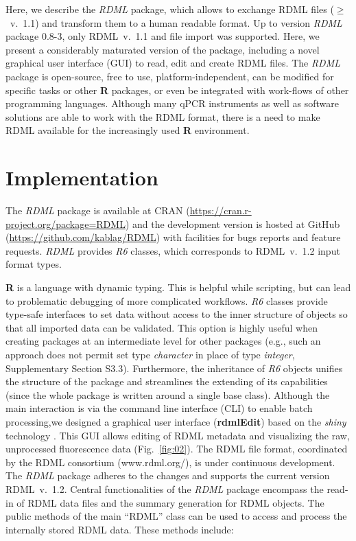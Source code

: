 \documentclass{bioinfo}
\begin{document}
Here, we describe the \textit{RDML} package, which 
allows to exchange RDML files ($\geq$~v.~1.1) and transform them to a human 
readable format. Up to version \textit{RDML} package 0.8-3, only RDML~v.~1.1 and 
file import was supported. Here, we present a considerably maturated version of 
the package, including a novel graphical user interface (GUI) to read, edit and create RDML files. The \textit{RDML} package is open-source, free to use, 
platform-independent, can be modified for specific tasks or other 
\textbf{R} packages, or even be integrated with work-flows of other programming 
languages. Although many qPCR instruments as well as software solutions are able 
to work with the RDML format, there is a need to make RDML available for the increasingly 
used \textbf{R} environment.

\section{Implementation}
The \textit{RDML} package is available at CRAN 
(\url{https://cran.r-project.org/package=RDML}) and the 
development version is hosted at GitHub (\url{https://github.com/kablag/RDML}) 
with facilities for bugs reports and feature requests. \textit{RDML} provides 
\emph{R6} classes, which corresponds to RDML~v.~1.2 input format types. 

\textbf{R} 
is a language with dynamic typing. This is helpful while scripting, but can lead 
to problematic debugging of more complicated workflows. \emph{R6} classes 
provide type-safe interfaces to set data without access to the inner structure of 
objects so that all imported data can be validated. This option is highly useful when 
creating packages at an intermediate level for other packages (e.g., such an
approach does not permit set type \emph{character} in place of type \emph{integer}, 
Supplementary Section S3.3). Furthermore, the inheritance of \emph{R6} objects 
unifies the structure of the package and streamlines the extending of its capabilities 
(since the whole package is written around a single base class). Although the main interaction 
is via the command line interface (CLI) to enable batch processing,we designed a graphical user
interface (\textbf{rdmlEdit}) based on the \textit{shiny} technology \cite{shiny_2016}. This GUI allows editing of RDML metadata and visualizing the raw, unprocessed fluorescence data
(Fig.~\ref{fig:02}). The RDML file format, coordinated by the RDML consortium (www.rdml.org/), is under continuous development. The \textit{RDML} 
package adheres to the changes and supports the current version RDML~v.~1.2. 
Central functionalities of the \textit{RDML} package encompass the read-in of RDML 
data files and the summary generation for RDML objects. The public methods of the main “RDML” class can be used 
to access and process the internally stored RDML data. These methods include:
\end{document}
